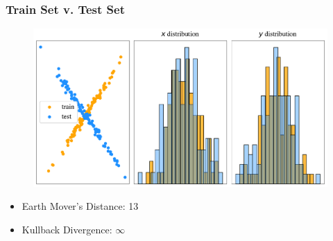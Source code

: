 \documentclass[serif, xcolor={dvipsnames}]{beamer} %
\begin{document}
\begin{frame}[t]
\frametitle{Train Set v. Test Set}
\vspace{-.2in}
\begin{figure}[htbp]
\centering
\includegraphics[width=\linewidth]{hist_comparition_one_at_a_time}
\end{figure}
\pause
\begin{itemize}
\item Earth Mover's Distance: 13
\item Kullback Divergence: $\infty$
\end{itemize}
\end{frame}
\end{document}
